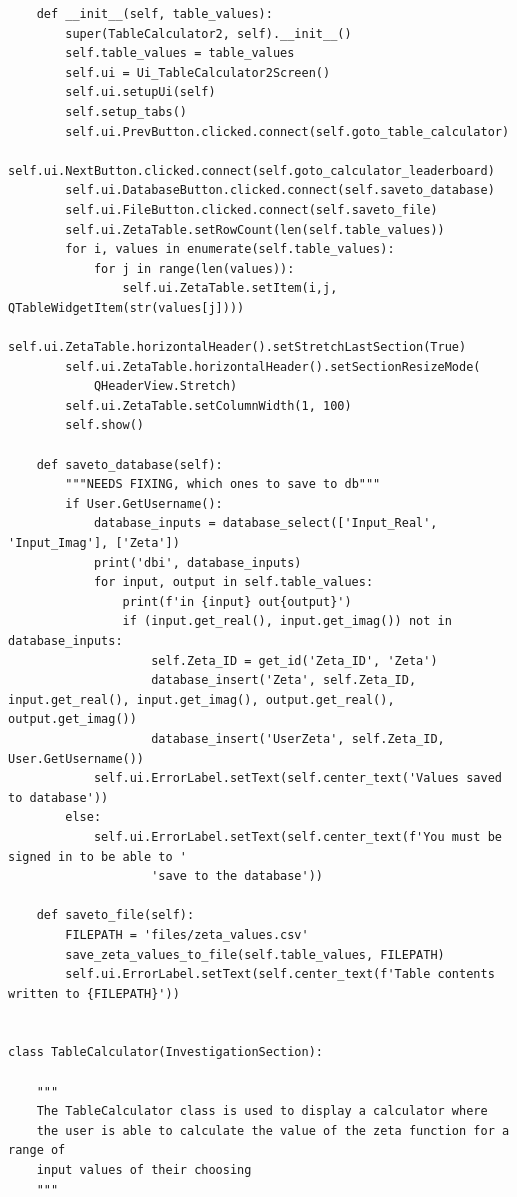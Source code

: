 \documentclass{article}
\begin{document}
\begin{lstlisting}
    def __init__(self, table_values):
        super(TableCalculator2, self).__init__()
        self.table_values = table_values
        self.ui = Ui_TableCalculator2Screen()
        self.ui.setupUi(self)
        self.setup_tabs()
        self.ui.PrevButton.clicked.connect(self.goto_table_calculator)
        self.ui.NextButton.clicked.connect(self.goto_calculator_leaderboard)
        self.ui.DatabaseButton.clicked.connect(self.saveto_database)
        self.ui.FileButton.clicked.connect(self.saveto_file)
        self.ui.ZetaTable.setRowCount(len(self.table_values))
        for i, values in enumerate(self.table_values):
            for j in range(len(values)):
                self.ui.ZetaTable.setItem(i,j, QTableWidgetItem(str(values[j])))
        self.ui.ZetaTable.horizontalHeader().setStretchLastSection(True)
        self.ui.ZetaTable.horizontalHeader().setSectionResizeMode(
            QHeaderView.Stretch)
        self.ui.ZetaTable.setColumnWidth(1, 100)
        self.show()

    def saveto_database(self):
        """NEEDS FIXING, which ones to save to db"""
        if User.GetUsername():
            database_inputs = database_select(['Input_Real', 'Input_Imag'], ['Zeta'])
            print('dbi', database_inputs)
            for input, output in self.table_values:
                print(f'in {input} out{output}')
                if (input.get_real(), input.get_imag()) not in database_inputs:
                    self.Zeta_ID = get_id('Zeta_ID', 'Zeta')
                    database_insert('Zeta', self.Zeta_ID, input.get_real(), input.get_imag(), output.get_real(), output.get_imag())
                    database_insert('UserZeta', self.Zeta_ID, User.GetUsername())
            self.ui.ErrorLabel.setText(self.center_text('Values saved to database'))
        else:
            self.ui.ErrorLabel.setText(self.center_text(f'You must be signed in to be able to '
                    'save to the database'))

    def saveto_file(self):
        FILEPATH = 'files/zeta_values.csv'
        save_zeta_values_to_file(self.table_values, FILEPATH)
        self.ui.ErrorLabel.setText(self.center_text(f'Table contents written to {FILEPATH}'))


class TableCalculator(InvestigationSection):

    """
    The TableCalculator class is used to display a calculator where
    the user is able to calculate the value of the zeta function for a range of
    input values of their choosing
    """


\end{lstlisting}
\end{document}
